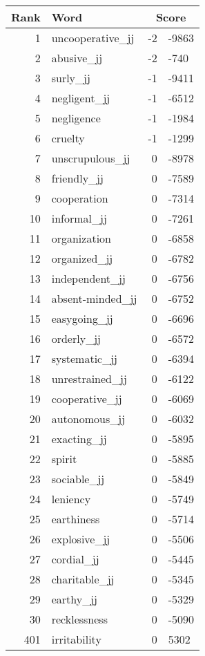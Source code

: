 \begin{longtable}[!htbp]{| rlr@{.}l |}
    \hline
    \textbf{Rank} & \textbf{Word} & \multicolumn{2}{c|}{\textbf{Score}} \\
    \hline
    \endhead
    1 & uncooperative\_jj & -2 & -9863 \\
    2 & abusive\_jj & -2 & -740 \\
    3 & surly\_jj & -1 & -9411 \\
    4 & negligent\_jj & -1 & -6512 \\
    5 & negligence & -1 & -1984 \\
    6 & cruelty & -1 & -1299 \\
    7 & unscrupulous\_jj & 0 & -8978 \\
    8 & friendly\_jj & 0 & -7589 \\
    9 & cooperation & 0 & -7314 \\
    10 & informal\_jj & 0 & -7261 \\
    11 & organization & 0 & -6858 \\
    12 & organized\_jj & 0 & -6782 \\
    13 & independent\_jj & 0 & -6756 \\
    14 & absent-minded\_jj & 0 & -6752 \\
    15 & easygoing\_jj & 0 & -6696 \\
    16 & orderly\_jj & 0 & -6572 \\
    17 & systematic\_jj & 0 & -6394 \\
    18 & unrestrained\_jj & 0 & -6122 \\
    19 & cooperative\_jj & 0 & -6069 \\
    20 & autonomous\_jj & 0 & -6032 \\
    21 & exacting\_jj & 0 & -5895 \\
    22 & spirit & 0 & -5885 \\
    23 & sociable\_jj & 0 & -5849 \\
    24 & leniency & 0 & -5749 \\
    25 & earthiness & 0 & -5714 \\
    26 & explosive\_jj & 0 & -5506 \\
    27 & cordial\_jj & 0 & -5445 \\
    28 & charitable\_jj & 0 & -5345 \\
    29 & earthy\_jj & 0 & -5329 \\
    30 & recklessness & 0 & -5090 \\
    401 & irritability & 0 & 5302 \\

\end{longtable}
